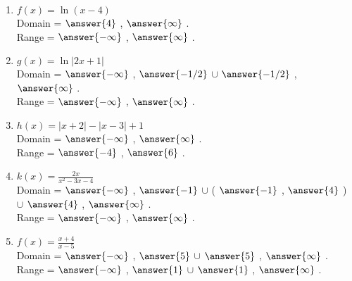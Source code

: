 \documentclass{ximera}
\begin{document}
\begin{exercise}
\begin{enumerate}
\item $f(x) = \ln(x-4)$ \\
Domain = \wordChoice{\choice[correct]{(}\choice{[}} $\answer{4}$ , $\answer{\infty}$ \wordChoice{\choice[correct]{)}\choice{]}}.\\
Range = \wordChoice{\choice[correct]{(}\choice{[}} $\answer{-\infty}$ , $\answer{\infty}$ \wordChoice{\choice[correct]{)}\choice{]}}.


\item $g(x) =  \ln|2x+1|$ \\
Domain = \wordChoice{\choice[correct]{(}\choice{[}} 
$\answer{-\infty}$ , $\answer{-1/2}$ 
\wordChoice{\choice[correct]{)}\choice{]}} 
$\cup$  
\wordChoice{\choice[correct]{(}\choice{[}} 
$\answer{-1/2}$ , $\answer{\infty}$ 
\wordChoice{\choice[correct]{)}\choice{]}}.\\
Range = \wordChoice{\choice[correct]{(}\choice{[}} 
$\answer{-\infty}$ , $\answer{\infty}$ 
\wordChoice{\choice[correct]{)}\choice{]}}.


\item $h(x) =  |x+2|-|x-3|+1$ \\
Domain = \wordChoice{\choice[correct]{(}\choice{[}} 
$\answer{-\infty}$ , $\answer{\infty}$ 
\wordChoice{\choice[correct]{)}\choice{]}}.\\
Range = \wordChoice{\choice{(}\choice[correct]{[}} $\answer{-4}$ , $\answer{6}$ \wordChoice{\choice{)}\choice[correct]{]}}.


\item $k(x)= \frac{2x}{x^2-3x-4}$\\
Domain = \wordChoice{\choice[correct]{(}\choice{[}} 
$\answer{-\infty}$ , $\answer{-1}$ 
\wordChoice{\choice[correct]{)}\choice{]}} 
$\cup$  
\Big( 
$\answer{-1}$ , $\answer{4}$ 
\Big)
$\cup$  
\wordChoice{\choice[correct]{(}\choice{[}} 
$\answer{4}$ , $\answer{\infty}$ 
\wordChoice{\choice[correct]{)}\choice{]}}.\\
Range = \wordChoice{\choice[correct]{(}\choice{[}} 
$\answer{-\infty}$ , $\answer{\infty}$ 
\wordChoice{\choice[correct]{)}\choice{]}}.


\item $f(x) =  \frac{x+4}{x-5}$\\
Domain = \wordChoice{\choice[correct]{(}\choice{[}} 
$\answer{-\infty}$ , $\answer{5}$ 
\wordChoice{\choice[correct]{)}\choice{]}} 
$\cup$  
\wordChoice{\choice[correct]{(}\choice{[}} 
$\answer{5}$ , $\answer{\infty}$ 
\wordChoice{\choice[correct]{)}\choice{]}}.\\
Range = \wordChoice{\choice[correct]{(}\choice{[}} 
$\answer{-\infty}$ , $\answer{1}$ 
\wordChoice{\choice[correct]{)}\choice{]}} 
$\cup$  
\wordChoice{\choice[correct]{(}\choice{[}} 
$\answer{1}$ , $\answer{\infty}$ 
\wordChoice{\choice[correct]{)}\choice{]}}.

\end{enumerate}

\end{exercise}
\end{document}
